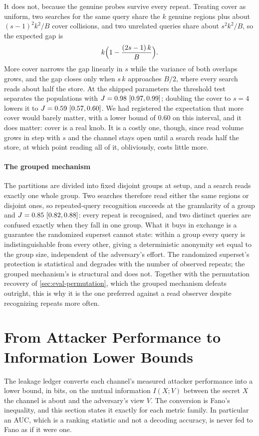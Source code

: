 \documentclass[10pt,journal,compsoc]{IEEEtran}
\begin{document}
It does not, because the genuine probes survive every repeat. Treating cover as uniform, two
searches for the same query share the $k$ genuine regions plus about $(s-1)^2k^2/B$ cover
collisions, and two unrelated queries share about $s^2k^2/B$, so the expected gap is
\[
  k\Bigl(1 - \frac{(2s-1)\,k}{B}\Bigr).
\]
More cover narrows the gap linearly in $s$ while the variance of both overlaps grows, and the gap
closes only when $s\,k$ approaches $B/2$, where every search reads about half the store. At the
shipped parameters the threshold test separates the populations with $J = 0.98~[0.97, 0.99]$;
doubling the cover to $s = 4$ lowers it to $J = 0.59~[0.57, 0.60]$. We had registered the
expectation that more cover would barely matter, with a lower bound of 0.60 on this interval, and
it does matter: cover is a real knob. It is a costly one, though, since read volume grows in step
with $s$ and the channel stays open until a search reads half the store, at which point reading
all of it, obliviously, costs little more.

\paragraph{The grouped mechanism} The partitions are divided into fixed disjoint groups at setup,
and a search reads exactly one whole group. Two searches therefore read either the same regions or
disjoint ones, so repeated-query recognition succeeds at the granularity of a group and
$J = 0.85~[0.82, 0.88]$: every repeat is recognised, and two distinct queries are confused
exactly when they fall in one group.
What it buys in exchange is a guarantee the randomized superset cannot state: within a group every
query is indistinguishable from every other, giving a deterministic anonymity set equal to the
group size, independent of the adversary's effort. The randomized superset's protection is
statistical and degrades with the number of observed repeats; the grouped mechanism's is structural
and does not. Together with the permutation recovery of \cref{sec:eval-permutation}, which the
grouped mechanism defeats outright, this is why it is the one preferred against a read observer
despite recognizing repeats more often.

\section{From Attacker Performance to Information Lower Bounds}
\label{supp:fano}

The leakage ledger converts each channel's measured attacker performance into a lower bound, in
bits, on the mutual information $I(X;V)$ between the secret $X$ the channel is about and the
adversary's view $V$. The conversion is Fano's inequality, and this section states it exactly for
each metric family. In particular an AUC, which is a ranking statistic and not a decoding accuracy,
is never fed to Fano as if it were one.
\end{document}
